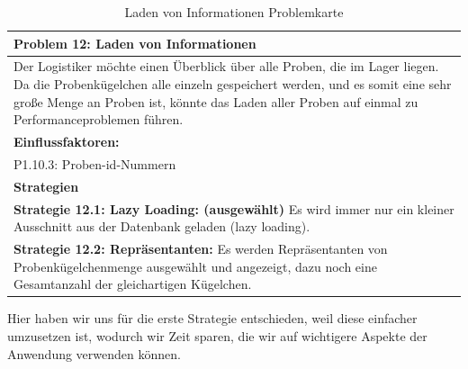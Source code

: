 \documentclass[enabledeprecatedfontcommands,fontsize=12pt,paper=a4,twoside]{scrartcl}
\begin{document}
\begin{table}[H]
    \centering
    \begin{tabular}{|p{15cm}|}
    \hline
          \textbf{Problem 12:} Laden von Informationen
          \\ \hline
          Der Logistiker möchte einen Überblick über alle Proben, die im Lager liegen. Da die Probenkügelchen alle einzeln gespeichert werden, und es somit eine sehr große Menge an Proben ist, könnte das Laden aller Proben auf einmal zu Performanceproblemen führen.
        \\  \hline
        \textbf{Einflussfaktoren: } \\
	 P1.10.3: Proben-id-Nummern \\
        \hline
        \textbf{Strategien} \\
         \textbf{Strategie 12.1: Lazy Loading: (ausgewählt)} Es wird immer nur ein kleiner Ausschnitt aus der Datenbank geladen (lazy loading). \\
         \textbf{Strategie 12.2: Repräsentanten:} Es werden Repräsentanten von Probenkügelchenmenge ausgewählt und angezeigt, dazu noch eine Gesamtanzahl der gleichartigen Kügelchen. \\ \hline
    \end{tabular}
    \caption{Laden von Informationen Problemkarte}
    \label{tab:ProblemKarte12}
\end{table}
Hier haben wir uns für die erste Strategie entschieden, weil diese einfacher umzusetzen ist, wodurch wir Zeit sparen, die wir auf wichtigere Aspekte der Anwendung verwenden können. 

\end{document}
